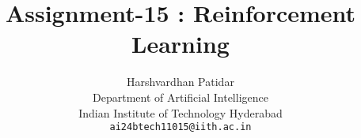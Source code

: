 \documentclass{article}
\title{Assignment-15 : Reinforcement Learning}
\author{Harshvardhan Patidar\\
  Department of Artificial Intelligence\\
  Indian Institute of Technology Hyderabad\\
  \texttt{ai24btech11015@iith.ac.in}
}
\begin{document}
\



\maketitle






















\end{document}
